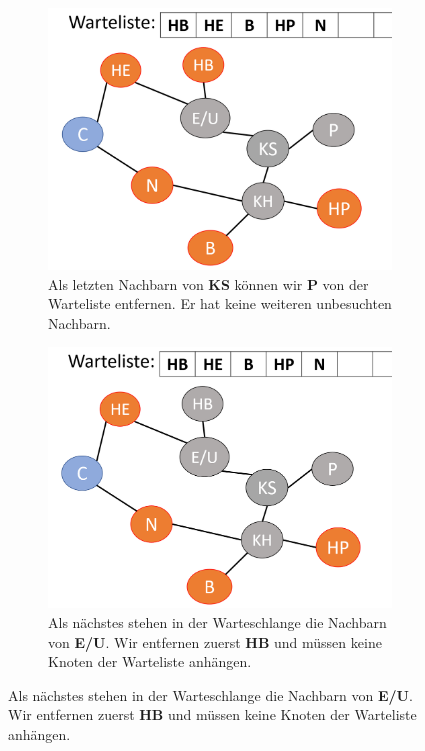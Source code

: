 \begin{figure}[H]\ContinuedFloat
    \begin{subfigure}[h!]{0.45\textwidth}
    \centering
    \includegraphics[width=\textwidth]{Pictures/BS/BFSB4.PNG}
    \caption{Als letzten Nachbarn von {\bf{KS}} können wir {\bf{P}} von der Warteliste entfernen. Er hat keine weiteren unbesuchten Nachbarn.} 
    \end{subfigure}
    \vspace{5mm}
    \qquad
    \begin{subfigure}[h]{0.45\textwidth}
    \centering
    \includegraphics[width=\textwidth]{Pictures/BS/BFSB5.PNG}
    \caption{Als nächstes stehen in der Warteschlange die Nachbarn von {\bf{E/U}}. Wir entfernen zuerst {\bf{HB}} und müssen keine Knoten der Warteliste anhängen.}

\end{subfigure}
\end{figure}
